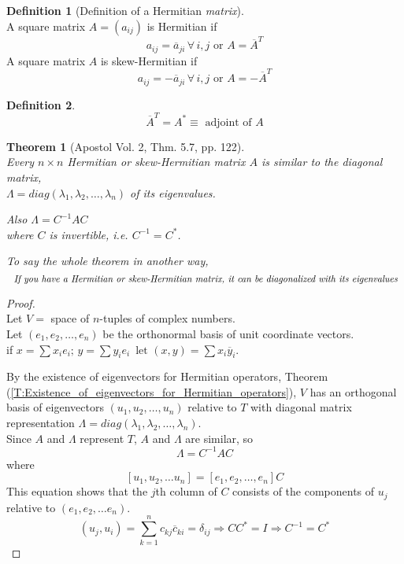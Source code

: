 \documentclass[twoside]{amsart}
\theoremstyle{plain}
\newtheorem{theorem}{Theorem}
\theoremstyle{definition}
\newtheorem{definition}{Definition}
\begin{document}
\begin{definition}[Definition of a Hermitian \emph{matrix}] \quad \\
  A square matrix $A = (a_{ij})$ is Hermitian if 
  \begin{equation*}
    a_{ij} = \overline{a}_{ji} \, \forall \, i,j \text{ or } A = \overline{A}^{T} 
  \end{equation*}
  A square matrix $A$ is skew-Hermitian if 
  \begin{equation*}
    a_{ij} = - \overline{a}_{ji} \, \forall \, i,j \text{ or } A = - \overline{A}^{T}
  \end{equation*}
\end{definition}
\begin{definition} 
  \begin{equation*}
    \overline{A}^T = A^* \equiv \text{ adjoint of } A
  \end{equation*}
\end{definition}

\begin{theorem}[Apostol Vol. 2, Thm. 5.7, pp. 122] \quad \\
Every $n \times n $ Hermitian or skew-Hermitian matrix $A$ is similar to the diagonal matrix, \\
\phantom{Every}  $\Lambda = diag( \lambda_1, \lambda_2, \dots, \lambda_n) $ of its eigenvalues.  

Also $\Lambda = C^{-1} AC$ \\
\phantom{Also} where $C$ is invertible, i.e. $C^{-1} = C^*$.  

To say the whole theorem in another way, 
\[
\text{ \emph{ If you have a Hermitian or skew-Hermitian matrix, it can be diagonalized with its eigenvalues }} 
\]
\end{theorem}
\begin{proof} \quad \\
Let $V = $ space of $n$-tuples of complex numbers. \\
Let $(e_1,e_2, \dots, e_n)$ be the orthonormal basis of unit coordinate vectors.  \\
\phantom{Let} if $x = \sum x_i e_i; \, y = \sum y_i e_i \, \text{ let } (x,y) = \sum x_i \overline{y}_i $.  

By the existence of eigenvectors for Hermitian operators, Theorem (\ref{T:Existence_of_eigenvectors_for_Hermitian_operators}), $V$ has an orthogonal basis of eigenvectors $(u_1,u_2, \dots, u_n)$ relative to $T$ with diagonal matrix representation $\Lambda = diag( \lambda_1, \lambda_2, \dots, \lambda_n)$.  \bigskip \\
Since $A$ and $\Lambda$ represent $T$, $A$ and $\Lambda$ are similar, so 
\[
\Lambda = C^{-1} AC
\]
where 
\[
[ u_1, u_2, \dots u_n ] = [e_1, e_2, \dots, e_n]C
\]
This equation shows that the $j$th column of $C$ consists of the components of $u_j$ relative to $(e_1,e_2, \dots e_n)$.  
\[
(u_j, u_i) = \sum_{k=1}^n c_{kj}\overline{c}_{ki} = \delta_{ij} \Longrightarrow CC^* = I \Longrightarrow C^{-1} = C^*
\]
\end{proof}
\end{document}
